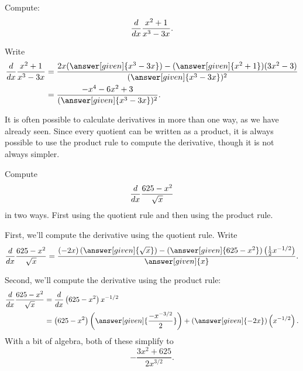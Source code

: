 \documentclass{ximera}
\begin{document}


\begin{example}
Compute:
\[
\frac{d}{dx} \frac{x^2+1}{x^3-3x}.
\]

\begin{explanation}
Write
\begin{align*}
\ddx \frac{x^2+1}{x^3-3x} &= \frac{2x(\answer[given]{x^3-3x})-(\answer[given]{x^2+1})(3x^2-3)}{(\answer[given]{x^3-3x})^2}\\
&=\frac{-x^4-6x^2+3}{(\answer[given]{x^3-3x})^2}.
\end{align*}
\end{explanation}
\end{example}

It is often possible to calculate derivatives in more than one way, as
we have already seen. Since every quotient can be written as a
product, it is always possible to use the product rule to compute the
derivative, though it is not always simpler.

\begin{example}
Compute 
\[
\frac{d}{dx} \frac{625-x^2}{\sqrt{x}}
\] 
in two ways. First using the quotient rule and then using the product
rule.
\begin{explanation}
First, we'll compute the derivative using the quotient rule. Write
\[
\ddx \frac{625-x^2}{\sqrt{x}} = \frac{\left(-2x\right)\left(\answer[given]{\sqrt{x}}\right) - (\answer[given]{625-x^2})\left(\frac{1}{2}x^{-1/2}\right)}{\answer[given]{x}}.
\]
\end{explanation}
\begin{explanation}
Second, we'll compute the derivative using the product rule:
\begin{align*}
\ddx \frac{625-x^2}{\sqrt{x}} &= \ddx \left(625-x^2\right)x^{-1/2}\\
&=\left(625-x^2\right)\left(\answer[given]{\frac{-x^{-3/2}}{2}}\right)+ (\answer[given]{-2x})\left(x^{-1/2}\right).
\end{align*}
With a bit of algebra, both of these simplify to
\[
-\frac{3x^2+625}{2x^{3/2}}.
\]
\end{explanation}
\end{example}
\end{document}
